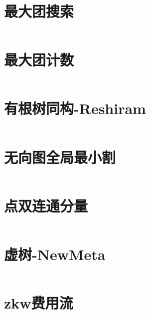 \section{最大团搜索}
\inputminted{cpp}{./graph-theory/maximum-clique.cpp}
\section{最大团计数}
\inputminted{cpp}{./graph-theory/maximum-clique-counting.cpp}
\section{有根树同构-Reshiram}
\inputminted{cpp}{./graph-theory/rooted-tree-isomorphism-Reshiram.cpp}
\section{无向图全局最小割}
\inputminted{cpp}{./graph-theory/StoerWagner.cpp}
\section{点双连通分量}
\inputminted{cpp}{./graph-theory/vertex-biconnected-component.cpp}
\section{虚树-NewMeta}
\inputminted{cpp}{./graph-theory/virtual-tree-NewMeta.cpp}
\section{zkw费用流}
\inputminted{cpp}{./graph-theory/zkw-cost-flow.cpp}